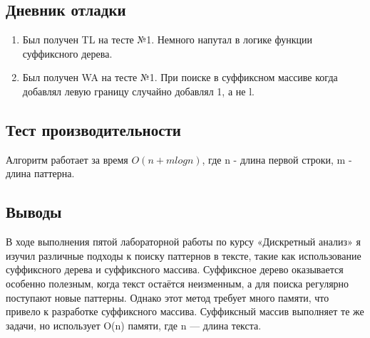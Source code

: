 \documentclass[12pt]{article}
\begin{document}
\newpage
\subsection*{Дневник отладки}

\begin{enumerate}
    \item Был получен TL на тесте №1. Немного напутал в логике функции суффиксного дерева. 
    \item Был получен WA на тесте №1. При поиске в суффиксном массиве когда добавлял левую границу случайно добавлял 1, а не l.
\end{enumerate}

\newpage
\subsection*{Тест производительности}

Алгоритм работает за время $O(n + m logn)$, где n - длина первой строки, m - длина паттерна.



\newpage
\subsection*{Выводы}

В ходе выполнения пятой лабораторной работы по курсу «Дискретный анализ» я изучил различные подходы к поиску паттернов в тексте, такие как использование суффиксного дерева и суффиксного массива. Суффиксное дерево оказывается особенно полезным, когда текст остаётся неизменным, а для поиска регулярно поступают новые паттерны. Однако этот метод требует много памяти, что привело к разработке суффиксного массива. Суффиксный массив выполняет те же задачи, но использует {O(n)} памяти, где {n} — длина текста.
\end{document}
